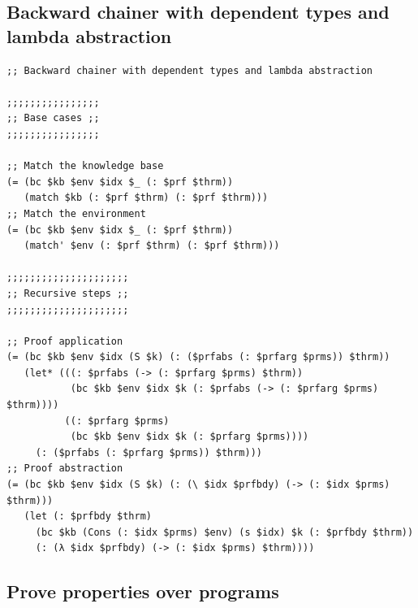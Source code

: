 \documentclass[aspectratio=169]{beamer}
\begin{document}
\subsection{Backward chainer with dependent types and lambda abstraction}

\begin{frame}[fragile]

  \begin{lstlisting}
;; Backward chainer with dependent types and lambda abstraction

;;;;;;;;;;;;;;;;
;; Base cases ;;
;;;;;;;;;;;;;;;;

;; Match the knowledge base
(= (bc $kb $env $idx $_ (: $prf $thrm))
   (match $kb (: $prf $thrm) (: $prf $thrm)))
;; Match the environment
(= (bc $kb $env $idx $_ (: $prf $thrm))
   (match' $env (: $prf $thrm) (: $prf $thrm)))

;;;;;;;;;;;;;;;;;;;;;
;; Recursive steps ;;
;;;;;;;;;;;;;;;;;;;;;

;; Proof application
(= (bc $kb $env $idx (S $k) (: ($prfabs (: $prfarg $prms)) $thrm))
   (let* (((: $prfabs (-> (: $prfarg $prms) $thrm))
           (bc $kb $env $idx $k (: $prfabs (-> (: $prfarg $prms) $thrm))))
          ((: $prfarg $prms)
           (bc $kb $env $idx $k (: $prfarg $prms))))
     (: ($prfabs (: $prfarg $prms)) $thrm)))
;; Proof abstraction
(= (bc $kb $env $idx (S $k) (: (\ $idx $prfbdy) (-> (: $idx $prms) $thrm)))
   (let (: $prfbdy $thrm)
     (bc $kb (Cons (: $idx $prms) $env) (s $idx) $k (: $prfbdy $thrm))
     (: (λ $idx $prfbdy) (-> (: $idx $prms) $thrm))))
  \end{lstlisting}

\end{frame}

\subsection{Prove properties over programs}
\end{document}

